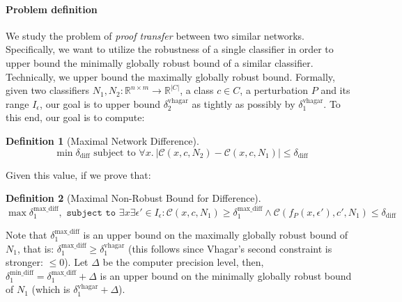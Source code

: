 \documentclass[11pt]{article}
\newtheorem{definition}{Definition}
\begin{document}
\begin{comment}
\paragraph{Global robustness of a cloud-edge framework}
We define the robustness property $\delta_\text{cloud-edge}$ of a cloud-edge framework, with a large network $N_1$ with robustness $\delta^{vhagar}(N_1)$ in the cloud and a smaller network $N_2$ in the edge with robustness $\delta^{vhagar}(N_2)$ as:
$$\min{\{\delta^{vhagar}(N_1),\delta^{vhagar}(N_2)\}} \leq \delta_\text{cloud-edge} \leq \max{\{\delta^{vhagar}(N_1),\delta^{vhagar}(N_2)\}}$$
\end{comment}
\paragraph{Problem definition} 
We study the problem of \emph{proof transfer} between two similar networks. 
Specifically, we want to utilize the robustness of a single classifier in order to upper bound the minimally globally robust bound of a similar classifier. 
Technically, we upper bound the maximally globally robust bound.
Formally, given two classifiers $N_1,N_2: \mathbb{R}^{n \times m} \rightarrow {\mathbb{R}}^{|C|}$, a class $c\in{C}$, a perturbation $P$ and its range $I_\epsilon$, our goal is to upper bound $\delta_2^\text{vhagar}$ as tightly as possibly by $\delta_1^\text{vhagar}$. To this end, our goal is to compute:
\begin{definition}[Maximal Network Difference]
\begin{equation}\label{eq:diff}
\min \delta_\text{diff}\text{ subject to } \forall x.\ |\mathcal{C}(x,c,N_2)-\mathcal{C}(x,c,N_1)|\leq \delta_\text{diff}
\end{equation}
\end{definition}
Given this value, if we prove that: 
\begin{definition}[Maximal Non-Robust Bound for Difference]
\begin{equation}\label{eq:vagdiff}
\max{\delta^\text{max\_diff}_1}, \texttt{ subject to } \exists{x}\exists{\epsilon'}\in{I_\epsilon}: \mathcal{C}(x,c,N_1) \geq \delta^\text{max\_diff}_1 \land \mathcal{C}(f_P(x,\epsilon'),c',N_1)\leq \delta_\text{diff}
\end{equation}
\end{definition}
Note that $\delta^\text{max\_diff}_1$ is an upper bound on the maximally globally robust bound of $N_1$, that is: $\delta^\text{max\_diff}_1\geq \delta^\text{vhagar}_1$ (this follows since Vhagar's second constraint is stronger: $\leq 0$). 
Let $\Delta$ be the computer precision level, then, $\delta^\text{min\_diff}_1 = \delta^\text{max\_diff}_1+\Delta$ is an upper bound on the minimally globally robust bound of $N_1$ (which is $\delta^\text{vhagar}_1+\Delta$).
\end{document}
